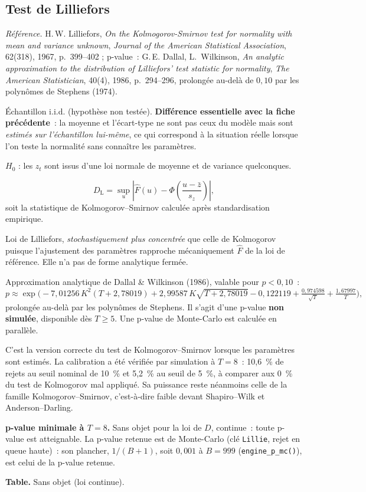 \documentclass[a4paper,11pt]{article}
\newcommand{\code}[1]{\texttt{\small #1}}
\newcommand{\refl}[1]{{\small\textcolor{maincolor!70!black}{\textit{Référence.} #1}}\par\smallskip}
\newcounter{ficheid}
\newenvironment{fiche}[1]{%
  \stepcounter{ficheid}%
  \phantomsection
  \subsection{#1}%
  \label{fiche:\theficheid}%
}{%
  \end{description}\vspace{0.5em}%
}
\newcommand{\Cadre}{%
  \begin{description}[leftmargin=0pt, style=unboxed, itemsep=3pt, topsep=3pt, parsep=2pt]%
  \item[\textcolor{financeblue}{\textbf{1. Cadre, notations et hypothèses de validité (non testées).}}]}
\newcommand{\Hzero}{\item[\textcolor{financeblue}{\textbf{2. Hypothèse nulle.}}]}
\newcommand{\Stat}{\item[\textcolor{financeblue}{\textbf{3. Statistique de test.}}]}
\newcommand{\Loi}{\item[\textcolor{financeblue}{\textbf{4. Loi sous $H_0$.}}]}
\newcommand{\Pval}{\item[\textcolor{financeblue}{\textbf{5. p-value.}}]}
\newcommand{\Usage}{\item[\textcolor{financeblue}{\textbf{6. Usage et limites.}}]}
\newcommand{\Pertinence}{\item[\textcolor{financeblue}{\textbf{7. Pertinence et puissance à faible $T$.}}]}
\begin{document}
\begin{fiche}{Test de Lilliefors}
\label{fiche:lilliefors}%
\refl{H.\,W. Lilliefors, \emph{On the Kolmogorov-Smirnov test for normality with mean and variance
unknown}, \emph{Journal of the American Statistical Association}, 62(318), 1967, p.~399--402 ;
p-value~: G.\,E. Dallal, L.~Wilkinson, \emph{An analytic approximation to the distribution of
Lilliefors' test statistic for normality}, \emph{The American Statistician}, 40(4), 1986,
p.~294--296, prolongée au-delà de $0{,}10$ par les polynômes de Stephens (1974).}
\Cadre
Échantillon i.i.d. (hypothèse non testée). \textbf{Différence essentielle avec la fiche
précédente}~: la moyenne et l'écart-type ne sont pas ceux du modèle mais sont \emph{estimés sur
l'échantillon lui-même}, ce qui correspond à la situation réelle lorsque l'on teste la normalité
sans connaître les paramètres.
\Hzero
$H_0$ : les $z_t$ sont issus d'une loi normale de moyenne et de variance quelconques.
\Stat
\[
  D_{\mathrm{L}} = \sup_u \left| \hat F(u) - \Phi\!\left(\frac{u - \bar z}{s_z}\right) \right|,
\]
soit la statistique de Kolmogorov--Smirnov calculée après standardisation empirique.
\Loi
Loi de Lilliefors, \emph{stochastiquement plus concentrée} que celle de Kolmogorov puisque
l'ajustement des paramètres rapproche mécaniquement $\hat F$ de la loi de référence. Elle n'a pas
de forme analytique fermée.
\Pval
Approximation analytique de Dallal \& Wilkinson (1986), valable pour $p < 0{,}10$~:
\[
  p \approx \exp\!\Big(-7{,}01256\,K^2(T + 2{,}78019) + 2{,}99587\,K\sqrt{T + 2{,}78019}
  - 0{,}122119 + \tfrac{0{,}974598}{\sqrt{T}} + \tfrac{1{,}67997}{T}\Big),
\]
prolongée au-delà par les polynômes de Stephens. Il s'agit d'une p-value \textbf{non simulée},
disponible dès $T \ge 5$. Une p-value de Monte-Carlo est calculée en parallèle.
\Usage
C'est la version correcte du test de Kolmogorov--Smirnov lorsque les paramètres sont estimés.
La calibration a été vérifiée par simulation à
$T = 8$~: 10,6~\% de rejets au seuil nominal de 10~\% et 5,2~\% au seuil de 5~\%, à comparer aux
0~\% du test de Kolmogorov mal appliqué. Sa puissance reste néanmoins celle de la famille
Kolmogorov--Smirnov, c'est-à-dire faible devant Shapiro--Wilk et Anderson--Darling.
\Pertinence
\textbf{p-value minimale à $T = 8$.} Sans objet pour la loi de $D$, continue~: toute p-value est atteignable. La p-value retenue est de Monte-Carlo (clé \code{Lillie}, rejet en queue haute)~: son plancher, $1/(B+1)$, soit $0{,}001$ à $B = 999$ (\code{engine\_p\_mc()}), est celui de la p-value retenue.

\textbf{Table.} Sans objet (loi continue).


\end{fiche}
\end{document}
